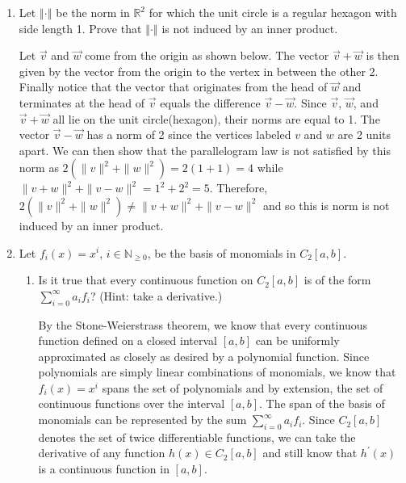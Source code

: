 \documentclass[12pt,letterpaper,reqno]{amsart}
\newcommand{\R}{\mathbb R}
\newcommand{\N}{\mathbb N}
\newcommand{\Norm}[1]{\left\Vert #1 \right \Vert}
\begin{document}
\begin{enumerate}[1.]
\item Let $\Norm{\cdot}$ be the norm in $\R^2$ for which the unit circle is a regular hexagon with side length 1. Prove that $\Norm{\cdot}$ is not induced by an inner product.
\begin{flushleft}
Let $\vec{v}$ and $\vec{w}$ come from the origin as shown below. The vector $\vec{v}+\vec{w}$ is then given by the vector from the origin to the vertex in between the other 2. Finally notice that the vector that originates from the head of $\vec{w}$ and terminates at the head of $\vec{v}$ equals the difference $\vec{v} - \vec{w}$. Since $\vec{v}$, $\vec{w}$, and $\vec{v}+\vec{w}$ all lie on the unit circle(hexagon), their norms are equal to 1. The vector $\vec{v} - \vec{w}$ has a norm of 2 since the vertices labeled $v$ and $w$ are 2 units apart. We can then show that the parallelogram law is not satisfied by this norm as $2(\|v\|^2 + \|w\|^2) = 2(1+1) = 4$ while $ \| v + w \|^2 + \| v - w \|^2 = 1^2 + 2^2 = 5$. Therefore,  $2(\|v\|^2 + \|w\|^2) \not= \|v + w\|^2 + \|v - w\|^2$ and so this is norm is not induced by an inner product.
\end{flushleft}
\begin{center}
\end{center}
\newpage
\item Let $f_i(x)=x^i$, $i\in \N_{\geq0}$, be the basis of monomials in $C_2[a,b]$.
\begin{enumerate}
\item Is it true that every continuous function on $C_2[a,b]$ is of the form $\sum_{i=0}^\infty a_if_i$? (Hint: take a derivative.)
\begin{flushleft}
By the Stone-Weierstrass theorem, we know that every continuous function defined on a closed interval $[a, b]$ can be uniformly approximated as closely as desired by a polynomial function. Since polynomials are simply linear combinations of monomials, we know that $f_i(x)=x^i$ spans the set of polynomials and by extension, the set of continuous functions over the interval $[a,b]$. The span of the basis of monomials can be represented by the sum $\sum_{i=0}^\infty a_if_i$. Since $C_2[a,b]$ denotes the set of twice differentiable functions, we can take the derivative of any function $h(x) \in C_2[a,b]$ and still know that $h^\prime(x)$ is a continuous function in $[a,b]$. 

\end{flushleft}
\end{enumerate}
\end{enumerate}
\end{document}
